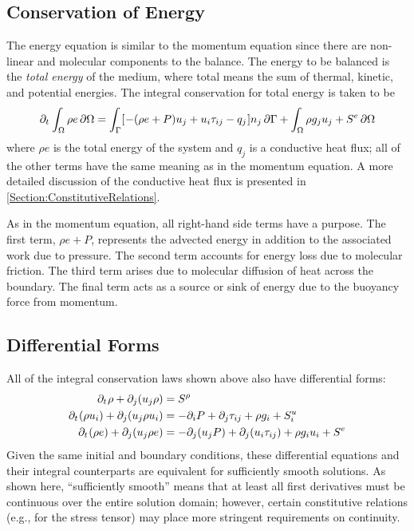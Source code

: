 \documentclass[12pt]{../UWMadThesis}
\begin{document}
\subsection{Conservation of Energy}
The energy equation is similar to the momentum equation since there are non-linear and molecular components to the balance.
The energy to be balanced is the \textit{total energy} of the medium, where total means the sum of thermal, kinetic, and potential energies.
The integral conservation for total energy is taken to be
\begin{equation}
    \pdt \IntV \rho e \dV = \IntS \left[- (\rho{e} + P) u_j + u_i \tau_{ij} - q_j\right] n_j\dS + \IntV \rho g_j u_j + S^e \dV
    \label{Eqn:IntegralCoE}
\end{equation}
where $\rho{e}$ is the total energy of the system and $q_j$ is a conductive heat flux; all of the other terms have the same meaning as in the momentum equation.
A more detailed discussion of the conductive heat flux is presented in \cref{Section:ConstitutiveRelations}.

As in the momentum equation, all right-hand side terms have a purpose.
The first term, $\rho{e} + P$, represents the advected energy in addition to the associated work due to pressure.
The second term accounts for energy loss due to molecular friction.
The third term arises due to molecular diffusion of heat across the boundary.
The final term acts as a source or sink of energy due to the buoyancy force from momentum.


\subsection{Differential Forms}
All of the integral conservation laws shown above also have differential forms:
\begin{align}
    \partial_t\:\! \rho + \partial_j(u_j \rho)           &= S^\rho \\
    \partial_t\:\! (\rho u_i) + \partial_j(u_j \rho u_i) &= -\partial_i{P} + \partial_j \tau_{ij} + \rho g_i + S^u_i \\
    \partial_t\:\! (\rho e) + \partial_j(u_j \rho{e})    &= -\partial_j(u_j P) + \partial_j(u_i \tau_{ij}) + \rho g_i u_i + S^e
\end{align}
Given the same initial and boundary conditions, these differential equations and their integral counterparts are equivalent for sufficiently smooth solutions.
As shown here, ``sufficiently smooth'' means that at least all first derivatives must be continuous over the entire solution domain; however, certain constitutive relations  (e.g., for the stress tensor) may place more stringent requirements on continuity.
\end{document}
